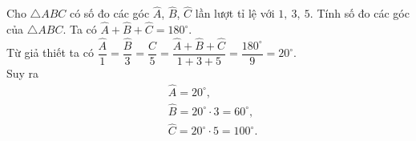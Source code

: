 \begin{vd}
	Cho $\triangle ABC$ có số đo các góc $\widehat{A}$, $\widehat{B}$, $\widehat{C}$ lần lượt tỉ lệ với $1,\ 3,\ 5$. Tính số đo các góc của $\triangle ABC$.
	\loigiai
	{
		Ta có $\widehat{A} + \widehat{B} + \widehat{C} = 180^\circ$.\\
		Từ giả thiết ta có $\dfrac{\widehat{A}}{1} = \dfrac{\widehat{B}}{3} = \dfrac{\widehat{C}}{5} = \dfrac{\widehat{A} + \widehat{B} + \widehat{C}}{1+3+5} = \dfrac{180^\circ}{9} = 20^\circ$.\\
		Suy ra
		{
			\allowdisplaybreaks
			\begin{align*}
			&\widehat{A} = 20^\circ,\\
			&\widehat{B} = 20^\circ \cdot 3 = 60^\circ,\\
			&\widehat{C} = 20^\circ \cdot 5 = 100^\circ.
			\end{align*}
		}
	}
\end{vd}

